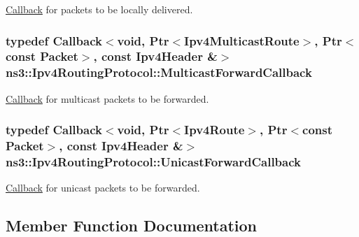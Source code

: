 \hyperlink{classns3_1_1Callback}{Callback} for packets to be locally delivered. 

\subsubsection[{\texorpdfstring{Multicast\+Forward\+Callback}{MulticastForwardCallback}}]{\setlength{\rightskip}{0pt plus 5cm}typedef {\bf Callback}$<$void, {\bf Ptr}$<${\bf Ipv4\+Multicast\+Route}$>$, {\bf Ptr}$<$const {\bf Packet}$>$, const {\bf Ipv4\+Header} \&$>$ {\bf ns3\+::\+Ipv4\+Routing\+Protocol\+::\+Multicast\+Forward\+Callback}}\hypertarget{classns3_1_1Ipv4RoutingProtocol_a26e76f7a555462e6c08fceda64a99d58}{}\label{classns3_1_1Ipv4RoutingProtocol_a26e76f7a555462e6c08fceda64a99d58}


\hyperlink{classns3_1_1Callback}{Callback} for multicast packets to be forwarded. 

\subsubsection[{\texorpdfstring{Unicast\+Forward\+Callback}{UnicastForwardCallback}}]{\setlength{\rightskip}{0pt plus 5cm}typedef {\bf Callback}$<$void, {\bf Ptr}$<${\bf Ipv4\+Route}$>$, {\bf Ptr}$<$const {\bf Packet}$>$, const {\bf Ipv4\+Header} \&$>$ {\bf ns3\+::\+Ipv4\+Routing\+Protocol\+::\+Unicast\+Forward\+Callback}}\hypertarget{classns3_1_1Ipv4RoutingProtocol_a3453a85764cbbb1e704da7e919aa5d19}{}\label{classns3_1_1Ipv4RoutingProtocol_a3453a85764cbbb1e704da7e919aa5d19}


\hyperlink{classns3_1_1Callback}{Callback} for unicast packets to be forwarded. 



\subsection{Member Function Documentation}
